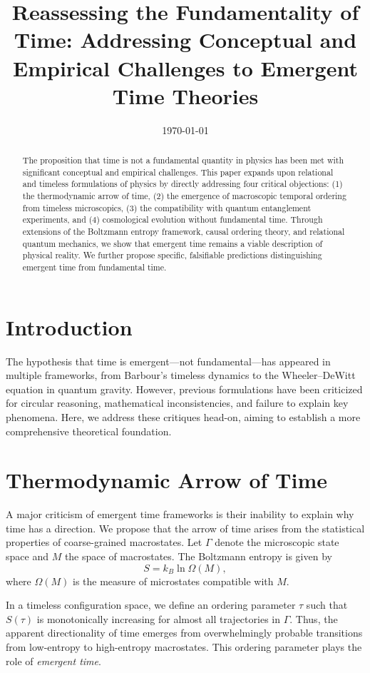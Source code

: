\documentclass[12pt]{article}
\title{\textbf{Reassessing the Fundamentality of Time: Addressing Conceptual and Empirical Challenges to Emergent Time Theories}}
\author{}
\date{\today}
\begin{document}
\maketitle

\begin{abstract}
The proposition that time is not a fundamental quantity in physics has been met with significant conceptual and empirical challenges. This paper expands upon relational and timeless formulations of physics by directly addressing four critical objections: (1) the thermodynamic arrow of time, (2) the emergence of macroscopic temporal ordering from timeless microscopics, (3) the compatibility with quantum entanglement experiments, and (4) cosmological evolution without fundamental time. Through extensions of the Boltzmann entropy framework, causal ordering theory, and relational quantum mechanics, we show that emergent time remains a viable description of physical reality. We further propose specific, falsifiable predictions distinguishing emergent time from fundamental time.
\end{abstract}

\section{Introduction}
The hypothesis that time is emergent---not fundamental---has appeared in multiple frameworks, from Barbour's timeless dynamics to the Wheeler--DeWitt equation in quantum gravity. However, previous formulations have been criticized for circular reasoning, mathematical inconsistencies, and failure to explain key phenomena. Here, we address these critiques head-on, aiming to establish a more comprehensive theoretical foundation.

\section{Thermodynamic Arrow of Time}
A major criticism of emergent time frameworks is their inability to explain why time has a direction. We propose that the arrow of time arises from the statistical properties of coarse-grained macrostates. Let $\Gamma$ denote the microscopic state space and $M$ the space of macrostates. The Boltzmann entropy is given by
\begin{equation}
S = k_B \ln \Omega(M),
\end{equation}
where $\Omega(M)$ is the measure of microstates compatible with $M$.

In a timeless configuration space, we define an ordering parameter $\tau$ such that $S(\tau)$ is monotonically increasing for almost all trajectories in $\Gamma$. Thus, the apparent directionality of time emerges from overwhelmingly probable transitions from low-entropy to high-entropy macrostates. This ordering parameter plays the role of \emph{emergent time}.
\end{document}
